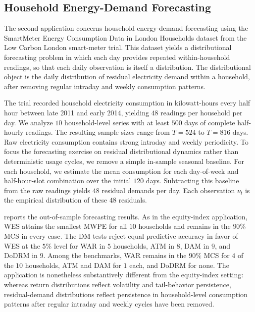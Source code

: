 \documentclass[a4paper, 11pt]{article}
\theoremstyle{definition}
\begin{document}
\subsection{Household Energy-Demand Forecasting}
\label{sec:smart_meter}

The second application concerns household energy-demand forecasting using the SmartMeter Energy Consumption Data in London Households dataset from the Low Carbon London smart-meter trial. 
This dataset yields a distributional forecasting problem in which each day provides repeated within-household readings, so that each daily observation is itself a distribution. 
The distributional object is the daily distribution of residual electricity demand within a household, after removing regular intraday and weekly consumption patterns.

The trial recorded household electricity consumption in kilowatt-hours every half hour between late 2011 and early 2014, yielding $48$ readings per household per day. 
We analyze $10$ household-level series with at least $500$ days of complete half-hourly readings.
The resulting sample sizes range from $T=524$ to $T=816$ days. 
Raw electricity consumption contains strong intraday and weekly periodicity. 
To focus the forecasting exercise on residual distributional dynamics rather than deterministic usage cycles, we remove a simple in-sample seasonal baseline. 
For each household, we estimate the mean consumption for each day-of-week and half-hour-slot combination over the initial $120$ days. 
Subtracting this baseline from the raw readings yields $48$ residual demands per day. 
Each observation $\nu_t$ is the empirical distribution of these $48$ residuals.

 reports the out-of-sample forecasting results. 
As in the equity-index application, WES attains the smallest MWPE for all $10$ households and remains in the $90\%$ MCS in every case.
The DM tests reject equal predictive accuracy in favor of WES at the $5\%$ level for WAR in $5$ households, ATM in $8$, DAM in $9$, and DoDRM in $9$.
Among the benchmarks, WAR remains in the $90\%$ MCS for $4$ of the $10$ households, ATM and DAM for $1$ each, and DoDRM for none.
The application is nonetheless substantively different from the equity-index setting: whereas return distributions reflect volatility and tail-behavior persistence, residual-demand distributions reflect persistence in household-level consumption patterns after regular intraday and weekly cycles have been removed.
\end{document}
